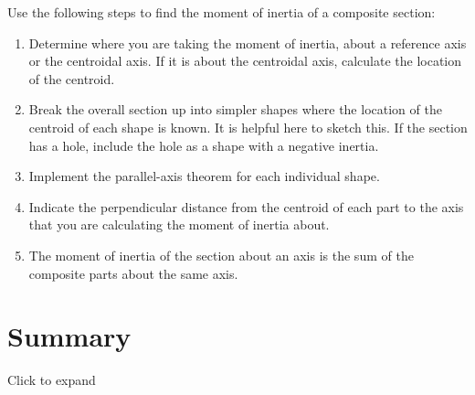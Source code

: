 \documentclass[
  letterpaper,
  DIV=11,
  numbers=noendperiod]{scrreprt}
\providecommand{\tightlist}{%
  \setlength{\itemsep}{0pt}\setlength{\parskip}{0pt}}\usepackage{longtable,booktabs,array}
\begin{document}
\begin{tcolorbox}[enhanced jigsaw, breakable, opacityback=0, toptitle=1mm, left=2mm, colback=white, opacitybacktitle=0.6, colframe=quarto-callout-warning-color-frame, titlerule=0mm, arc=.35mm, leftrule=.75mm, bottomtitle=1mm, colbacktitle=quarto-callout-warning-color!10!white, rightrule=.15mm, title=\textcolor{quarto-callout-warning-color}{\faExclamationTriangle}\hspace{0.5em}{Step-by-step: Finding the Moment of Inertia}, bottomrule=.15mm, toprule=.15mm, coltitle=black]

Use the following steps to find the moment of inertia of a composite
section:

\begin{enumerate}
\def\labelenumi{\arabic{enumi}.}
\tightlist
\item
  Determine where you are taking the moment of inertia, about a
  reference axis or the centroidal axis. If it is about the centroidal
  axis, calculate the location of the centroid.
\item
  Break the overall section up into simpler shapes where the location of
  the centroid of each shape is known. It is helpful here to sketch
  this. If the section has a hole, include the hole as a shape with a
  negative inertia.
\item
  Implement the parallel-axis theorem for each individual shape.
\item
  Indicate the perpendicular distance from the centroid of each part to
  the axis that you are calculating the moment of inertia about.
\item
  The moment of inertia of the section about an axis is the sum of the
  composite parts about the same axis.
\end{enumerate}

\end{tcolorbox}

\section*{Summary}\label{summary-6}


Click to expand
\end{document}
